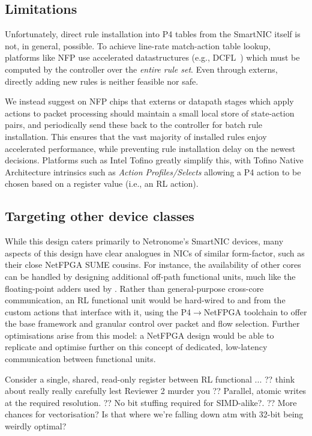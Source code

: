 \documentclass[sigconf,natbib=false]{acmart}
\begin{document}
\subsection{Limitations}\label{sec:limitations}
Unfortunately, direct rule installation into P4 tables from the SmartNIC itself is not, in general, possible.
To achieve line-rate match-action table lookup, platforms like NFP use accelerated datastructures (e.g., DCFL~\parencite{DBLP:conf/infocom/TaylorT05}) which must be computed by the controller over the \emph{entire rule set}.
Even through externs, directly adding new rules is neither feasible nor safe.

We instead suggest on NFP chips that externs or datapath stages which apply actions to packet processing should maintain a small local store of state-action pairs, and periodically send these back to the controller for batch rule installation.
This ensures that the vast majority of installed rules enjoy accelerated performance, while preventing rule installation delay on the newest decisions.
Platforms such as Intel Tofino greatly simplify this, with Tofino Native Architecture intrinsics such as \emph{Action Profiles/Selects} allowing a P4 action to be chosen based on a register value (i.e., an RL action).

\subsection{Targeting other device classes}
While this design caters primarily to Netronome's SmartNIC devices, many aspects of this design have clear analogues in NICs of similar form-factor, such as their close NetFPGA SUME cousins.
For instance, the availability of other cores can be handled by designing additional off-path functional units, much like the floating-point adders used by \textcite{DBLP:conf/isca/LiLYCSH19}.
Rather than general-purpose cross-core communication, an RL functional unit would be hard-wired to and from the custom actions that interface with it, using the P4$\rightarrow$NetFPGA toolchain to offer the base framework and granular control over packet and flow selection.
Further optimisations arise from this model: a NetFPGA design would be able to replicate and optimise further on this concept of dedicated, low-latency communication between functional units.

Consider a single, shared, read-only register between RL functional ...
?? think about really really carefully lest Reviewer 2 murder you
?? Parallel, atomic writes at the required resolution.
?? No bit stuffing required for SIMD-alike?.
?? More chances for vectorisation? Is that where we're falling down atm with 32-bit being weirdly optimal?
\end{document}
